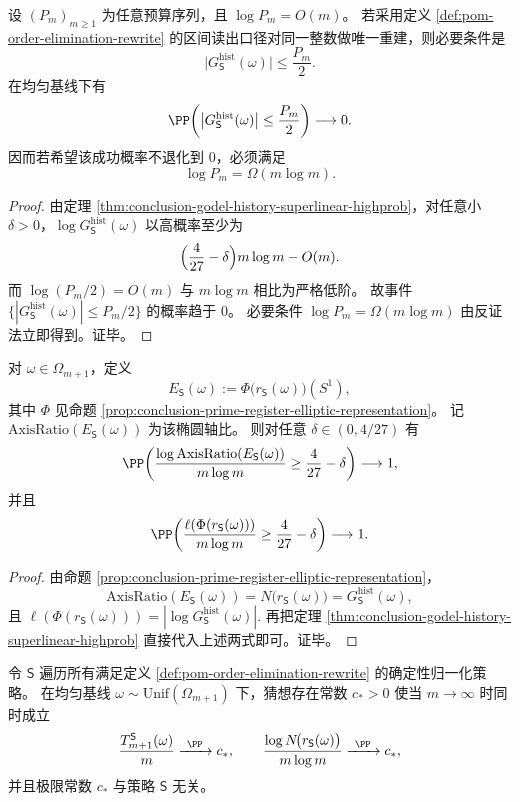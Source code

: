 \begin{theorem}\label{thm:conclusion-crt-linear-budget-impossibility}
设 \((P_m)_{m\ge 1}\) 为任意预算序列，且 \(\log P_m=O(m)\)。
若采用定义 \ref{def:pom-order-elimination-rewrite} 的区间读出口径对同一整数做唯一重建，则必要条件是
\[
\bigl|G_{\mathsf S}^{\mathrm{hist}}(\omega)\bigr|\le \frac{P_m}{2}.
\]
在均匀基线下有
\[
\PP\!\left(\bigl|G_{\mathsf S}^{\mathrm{hist}}(\omega)\bigr|\le \frac{P_m}{2}\right)\longrightarrow 0.
\]
因而若希望该成功概率不退化到 \(0\)，必须满足
\[
\log P_m=\Omega(m\log m).
\]
\end{theorem}
\begin{proof}
由定理 \ref{thm:conclusion-godel-history-superlinear-highprob}，对任意小 \(\delta>0\)，\(\log G_{\mathsf S}^{\mathrm{hist}}(\omega)\) 以高概率至少为
\[
\Bigl(\frac{4}{27}-\delta\Bigr)m\log m-O(m).
\]
而 \(\log(P_m/2)=O(m)\) 与 \(m\log m\) 相比为严格低阶。
故事件 \(\{|G_{\mathsf S}^{\mathrm{hist}}(\omega)|\le P_m/2\}\) 的概率趋于 \(0\)。
必要条件 \(\log P_m=\Omega(m\log m)\) 由反证法立即得到。证毕。
\end{proof}

\begin{theorem}\label{thm:conclusion-elliptic-geometric-complexity}
对 \(\omega\in\Omega_{m+1}\)，定义
\[
E_{\mathsf S}(\omega):=\Phi\!\bigl(r_{\mathsf S}(\omega)\bigr)(S^1),
\]
其中 \(\Phi\) 见命题 \ref{prop:conclusion-prime-register-elliptic-representation}。
记 \(\mathrm{AxisRatio}(E_{\mathsf S}(\omega))\) 为该椭圆轴比。
则对任意 \(\delta\in(0,4/27)\) 有
\[
\PP\!\left(
\frac{\log \mathrm{AxisRatio}(E_{\mathsf S}(\omega))}{m\log m}
\ge \frac{4}{27}-\delta
\right)\longrightarrow 1,
\]
并且
\[
\PP\!\left(
\frac{\ell\!\left(\Phi(r_{\mathsf S}(\omega))\right)}{m\log m}
\ge \frac{4}{27}-\delta
\right)\longrightarrow 1.
\]
\end{theorem}
\begin{proof}
由命题 \ref{prop:conclusion-prime-register-elliptic-representation}，
\[
\mathrm{AxisRatio}(E_{\mathsf S}(\omega))
=N\!\bigl(r_{\mathsf S}(\omega)\bigr)
=G_{\mathsf S}^{\mathrm{hist}}(\omega),
\]
且
\(
\ell(\Phi(r_{\mathsf S}(\omega)))=|\log G_{\mathsf S}^{\mathrm{hist}}(\omega)|.
\)
再把定理 \ref{thm:conclusion-godel-history-superlinear-highprob} 直接代入上述两式即可。证毕。
\end{proof}

\begin{conjecture}\label{conj:conclusion-strategy-invariant-godel-law}
令 \(\mathsf S\) 遍历所有满足定义 \ref{def:pom-order-elimination-rewrite} 的确定性归一化策略。
在均匀基线 \(\omega\sim\mathrm{Unif}(\Omega_{m+1})\) 下，猜想存在常数 \(c_\ast>0\) 使当 \(m\to\infty\) 时同时成立
\[
\frac{T_{m+1}^{\mathsf S}(\omega)}{m}\xrightarrow{\ \PP\ }c_\ast,
\qquad
\frac{\log N\!\bigl(r_{\mathsf S}(\omega)\bigr)}{m\log m}\xrightarrow{\ \PP\ }c_\ast,
\]
并且极限常数 \(c_\ast\) 与策略 \(\mathsf S\) 无关。
\end{conjecture}
